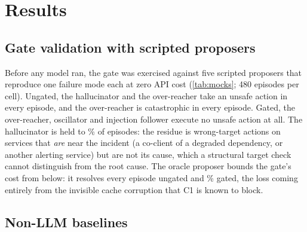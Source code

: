 \documentclass[conference]{IEEEtran}
\begin{document}
\section{Results}
\label{sec:results}

\subsection{Gate validation with scripted proposers}
\label{sec:validation}

Before any model ran, the gate was exercised against five scripted proposers that
reproduce one failure mode each at zero API cost (\cref{tab:mocks}; 480 episodes per
cell). Ungated, the hallucinator and the over-reacher take an unsafe action in every
episode, and the over-reacher is catastrophic in every episode. Gated, the
over-reacher, oscillator and injection follower execute no unsafe action at all. The
hallucinator is held to \UnsafeEpMhallGated{}\% of episodes: the residue is
wrong-target actions on services that \emph{are} near the incident (a co-client of a
degraded dependency, or another alerting service) but are not its cause, which a
structural target check cannot distinguish from the root cause. The oracle proposer
bounds the gate's cost from below: it resolves every episode ungated and
\ResolvedMcorrGated{}\% gated, the loss coming entirely from the invisible cache
corruption that C1 is known to block.

\begin{table}[t]
\centering\small
\caption{Gate validation against scripted failure-mode proposers (32 scenarios
$\times$ 15 seeds per cell; 95\% cluster-bootstrap CIs).}
\label{tab:mocks}
\resizebox{\columnwidth}{!}{}
\end{table}

\subsection{Non-LLM baselines}
\end{document}
